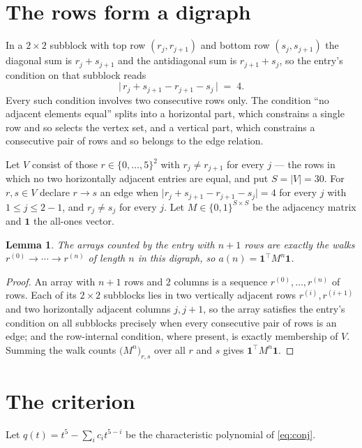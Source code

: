 \documentclass[11pt,a4paper]{article}
\theoremstyle{plain}
\newtheorem{lemma}[theorem]{Lemma}
\theoremstyle{definition}
\begin{document}
\section{The rows form a digraph}

In a $2\times2$ subblock with top row $(r_j,r_{j+1})$ and bottom row $(s_j,s_{j+1})$ the
diagonal sum is $r_j+s_{j+1}$ and the antidiagonal sum is $r_{j+1}+s_j$, so the entry's
condition on that subblock reads
\[
\bigl|\,r_j+s_{j+1}-r_{j+1}-s_j\,\bigr|\;=\;4.
\]
Every such condition involves two consecutive rows only. The condition ``no adjacent elements equal'' splits into a horizontal
part, which constrains a single row and so selects the vertex set, and a vertical part,
which constrains a consecutive pair of rows and so belongs to the edge relation.

Let $V$ consist of those $r\in\{0,\dots,5\}^{2}$ with $r_j\ne r_{j+1}$ for every
$j$ --- the rows in which no two horizontally adjacent entries are equal, and put $S=|V|=30$. For $r,s\in V$ declare $r\to s$ an edge
when $\bigl|r_j+s_{j+1}-r_{j+1}-s_j\bigr|=4$ for every $j$ with
$1\le j\le2-1$, and $r_j\ne s_j$ for every $j$. Let $M\in\{0,1\}^{S\times S}$ be the adjacency matrix and $\mathbf{1}$
the all-ones vector.

\begin{lemma}\label{lem:walk}
The arrays counted by the entry with $n+1$ rows are exactly the walks
$r^{(0)}\to\cdots\to r^{(n)}$ of length $n$ in this digraph, so
$a(n)=\mathbf{1}^{\!\top}M^{n}\mathbf{1}$.
\end{lemma}

\begin{proof}
An array with $n+1$ rows and $2$ columns is a sequence $r^{(0)},\dots,r^{(n)}$ of
rows. Each of its $2\times2$ subblocks lies in two vertically adjacent rows
$r^{(i)},r^{(i+1)}$ and two horizontally adjacent columns $j,j+1$, so the array satisfies
the entry's condition on all subblocks precisely when every consecutive pair of rows is an
edge; and the row-internal condition, where present, is exactly membership of $V$. Summing
the walk counts $\bigl(M^{n}\bigr)_{r,s}$ over all $r$ and $s$ gives
$\mathbf{1}^{\!\top}M^{n}\mathbf{1}$.
\end{proof}

\section{The criterion}

Let $q(t)=t^{5}-\sum_i c_i t^{5-i}$ be the characteristic polynomial of
\eqref{eq:conj}.
\end{document}

